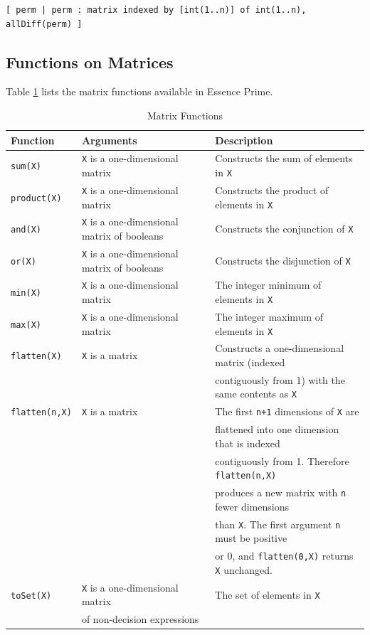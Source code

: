 \documentclass[a4paper]{article}
\newcommand{\eprime}{{\sc Essence Prime}\xspace}
\begin{document}
\begin{verbatim}
[ perm | perm : matrix indexed by [int(1..n)] of int(1..n), allDiff(perm) ]
\end{verbatim}


\subsection{Functions on Matrices\label{sec:matrix-functions}}

Table \ref{tab:matfunc} lists the matrix functions available in \eprime. 

\begin{table}
 \begin{tabular}{l|l|l} 
Function & Arguments & Description \\
\hline
{\tt sum(X)} & {\tt X} is a one-dimensional matrix & Constructs the sum of elements in \texttt{X} \\
\hline
{\tt product(X)} & {\tt X} is a one-dimensional matrix & Constructs the product of elements in \texttt{X} \\
\hline
{\tt and(X)} & {\tt X} is a one-dimensional matrix of booleans & Constructs the conjunction of \texttt{X} \\
\hline
{\tt or(X)} & {\tt X} is a one-dimensional matrix of booleans & Constructs the disjunction of \texttt{X} \\
\hline
{\tt min(X)} & {\tt X} is a one-dimensional matrix & The integer minimum of elements in \texttt{X} \\
\hline
{\tt max(X)} & {\tt X} is a one-dimensional matrix & The integer maximum of elements in \texttt{X} \\
\hline
{\tt flatten(X)} & {\tt X} is a matrix & Constructs a one-dimensional matrix (indexed  \\
                 &                     & contiguously from 1) with the same contents as \texttt{X} \\
\hline
{\tt flatten(n,X)} & {\tt X} is a matrix & The first \texttt{n+1} dimensions of \texttt{X} are \\
                   &                     & flattened into one dimension that is indexed \\
                   &                     & contiguously from 1. Therefore \texttt{flatten(n,X)} \\
                   &                     & produces a new matrix with \texttt{n} fewer dimensions\\
                   &                     & than \texttt{X}. The first argument \texttt{n} must be positive\\
                   &                     & or 0, and \texttt{flatten(0,X)} returns \texttt{X} unchanged.\\
\hline
{\tt toSet(X)} & {\tt X} is a one-dimensional matrix & The set of elements in \texttt{X} \\
               & of non-decision expressions         & \\
\end{tabular}
\caption{Matrix Functions\label{tab:matfunc}}
\end{table}
\end{document}
